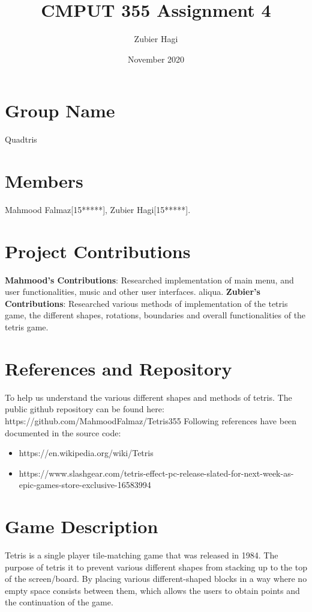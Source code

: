 \documentclass{article}
\title{CMPUT 355 Assignment 4}
\author{Zubier Hagi}
\date{November 2020}
\begin{document}
\maketitle
\section{Group Name}
Quadtris
\section{Members}
Mahmood Falmaz[15*****],
Zubier Hagi[15*****]. 
\section{Project Contributions}
\quad \textbf{Mahmood's Contributions}:
Researched implementation of main menu, and user functionalities, music and other user interfaces. aliqua.\newline
\textbf{Zubier's Contributions}:
Researched various methods of implementation of the tetris game, the different shapes, rotations, boundaries and overall functionalities of the tetris game.
\section{References and Repository}
\quad To help us understand the various different shapes and methods of tetris.
The public github repository can be found here: https://github.com/MahmoodFalmaz/Tetris355\newline
Following references have been documented in the source code:\newline
\begin{itemize}
\item https://en.wikipedia.org/wiki/Tetris\end{itemize}
\begin{itemize}
\item https://www.slashgear.com/tetris-effect-pc-release-slated-for-next-week-as-epic-games-store-exclusive-16583994\end{itemize}


\section{Game Description}
\quad Tetris is a single player tile-matching game that was released in 1984. The purpose of tetris it to prevent various different shapes from stacking up to the top of the screen/board. By placing various different-shaped blocks in a way where no empty space consists between them, which allows the users to obtain points and the continuation of the game. 
\end{document}
